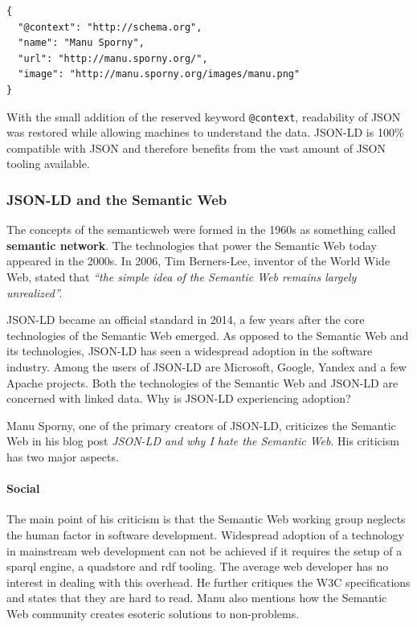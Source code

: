 \lstset{language=JSON}
\begin{lstlisting}[caption=Compacted data of a person, label=jsonldcompacted]
{
  "@context": "http://schema.org",
  "name": "Manu Sporny",
  "url": "http://manu.sporny.org/",
  "image": "http://manu.sporny.org/images/manu.png"
}
\end{lstlisting}

With the small addition of the reserved keyword \lstinline{@context}, readability of JSON was restored while allowing machines to understand the data. JSON-LD is 100\% compatible with JSON and therefore benefits from the vast amount of JSON tooling available.


\subsubsection{JSON-LD and the Semantic Web}
The concepts of the \gls{semanticweb} were formed in the 1960s as something called \textbf{semantic network}. The technologies that power the Semantic Web today appeared in the 2000s. In 2006, Tim Berners-Lee, inventor of the World Wide Web, stated that \textit{``the simple idea of the Semantic Web remains largely unrealized''.} \citep{semanticwebrevisited}

JSON-LD became an official standard in 2014, a few years after the core technologies of the Semantic Web emerged. As opposed to the Semantic Web and its technologies, JSON-LD has seen a widespread adoption in the software industry. Among the users of JSON-LD are Microsoft, Google, Yandex and a few Apache projects. \citep{jsonldusers} Both the technologies of the Semantic Web and JSON-LD are concerned with linked data. Why is JSON-LD experiencing adoption?

Manu Sporny, one of the primary creators of JSON-LD, criticizes the Semantic Web in his blog post \textit{JSON-LD and why I hate the Semantic Web}. His criticism has two major aspects.

\paragraph{Social}
The main point of his criticism is that the Semantic Web working group neglects the human factor in software development. Widespread adoption of a technology in mainstream web development can not be achieved if it requires the setup of a \gls{sparql} engine, a \gls{quadstore} and \gls{rdf} tooling. The average web developer has no interest in dealing with this overhead. He further critiques the W3C specifications and states that they are hard to read. \citep{semanticwebrevisited} Manu also mentions how the Semantic Web community creates esoteric solutions to non-problems. \citep{semanticwebrevisited}

